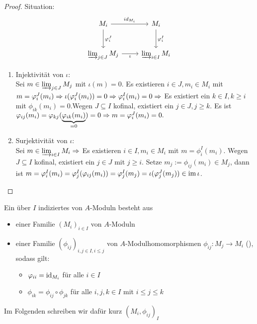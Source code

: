 \begin{proof}
	Situation: 
	$$\begin{tikzcd}[row sep = large]
	M_i \arrow{r}{id_{M_i}} \arrow{d}{\phi_i^J} & M_i \arrow{d}{\phi_i^I} \\
	\varinjlim_{j \in J} M_j \arrow[swap]{r}{\iota} & \varinjlim_{i\in I} M_i
	\end{tikzcd}$$
	\begin{enumerate}
		\item[] Injektivität von $\iota $: \\
		Sei $m \in \varinjlim_{j \in J} M_j $ mit $ \iota(m)=0$. Es existieren  $i \in J, m_i \in M_i $ mit $ m = \varphi_i^J(m_i) \Rightarrow \iota(\varphi_i^J(m_i)) =0 \Rightarrow \varphi_i^I(m_i) = 0  \Rightarrow $ Es existiert ein $k \in I, k \geq i $ mit $\phi_{ik}(m_i) =0$.Wegen $J \subseteq I $ kofinal, existiert ein $j\in J, j \geq k $. Es ist $\varphi_{ij}(m_i)= \varphi_{kj}(\underbrace{\varphi_{ik}(m_i)}_{=0}) = 0 \Rightarrow m = \varphi_i^J(m_i)=0. $
		\item[] Surjektivität von $\iota$: \\
		Sei $m \in \varinjlim_{i\in I} M_i \Rightarrow $ Es existieren $i \in I, m_i \in M_i $ mit $ m = \phi_i^I(m_i)$. Wegen $J \subseteq I $ kofinal, existiert  ein $j \in J $ mit $ j \geq i $. Setze $m_j := \phi_{ij}(m_i) \in M_j$, dann ist $m = \varphi_i^I(m_i) = \varphi_j^I(\varphi_{ij}(m_i)) = \varphi_j^I(m_j)=\iota(\varphi_j^J(m_j)) \in \operatorname{im}\iota $.
	\end{enumerate}
\end{proof}
\begin{df} \label{16.17}
	Ein über $I$ indiziertes  von $A$-Moduln besteht aus
	\begin{itemize}
		\item einer Familie $(M_i)_{i\in I}$ von $A$-Moduln
		\item einer Familie $(\phi_{ij})_{i,j\in I, i\leq j}$ von $A$-Modulhomomorphismen $\phi_{ij}:M_j \to M_i$ (), sodass gilt:
		\begin{itemize}
			\item $\varphi_{ii}= \operatorname{id}_{M_i}$ für alle $i\in I$
			\item $\phi_{ik}= \phi_{ij} \circ \phi_{jk}$ für alle $i,j,k\in I$ mit $i\leq j \leq k$
		\end{itemize}
	\end{itemize} 
	Im Folgenden schreiben wir dafür kurz $(M_i, \phi_{ij})_I$
\end{df}
